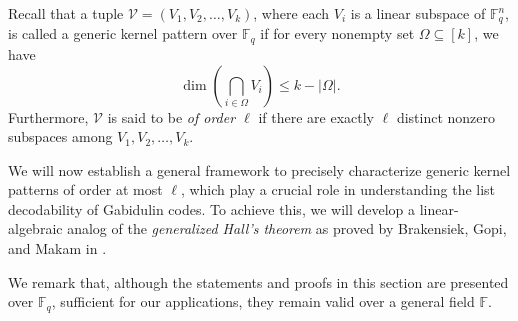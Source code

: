 \documentclass[11pt]{article}
\newif\ifmynotes
\newcommand{\ZGnote}[1]{\ifmynotes\textcolor{purple}{[Zeyu: #1]}\else\fi}
\newcommand{\ZZnote}[1]{\ifmynotes\textcolor{violet}{[Zihan: #1]}\else\fi}
\theoremstyle{plain}
\newtheorem{fa}[thm]{Fact}
\theoremstyle{definition}
\newtheorem{defn}[thm]{Definition}
\theoremstyle{remark}
\newcommand{\F}{\mathbb{F}}
\newcommand{\vm}{\bm{m}}
\begin{document}
Recall that a tuple $\mathcal{V}=(V_1,V_2,\ldots,V_k)$, where each $V_i$ is a linear subspace of $\F_q^n$, is called a generic kernel pattern over $\F_q$ if for every nonempty set $\Omega\subseteq [k]$, we have
\[
\dim\left(\bigcap_{i\in \Omega} V_i\right)\leq k-|\Omega|.
\]
Furthermore, $\mathcal{V}$ is said to be \emph{of order $\ell$} if there are exactly $\ell$ distinct nonzero subspaces among $V_1,V_2,\dots,V_k$. 

We will now establish a general framework to precisely characterize generic kernel patterns of order at most $\ell$, which play a crucial role in understanding the list decodability of Gabidulin codes. To achieve this, we will develop a linear-algebraic analog of the \emph{generalized Hall's theorem} as proved by Brakensiek, Gopi, and Makam in \cite{brakensiek2023generic}.

We remark that, although the statements and proofs in this section are presented over $\F_q$, sufficient for our applications, they remain valid over a general field $\F$.
\end{document}
